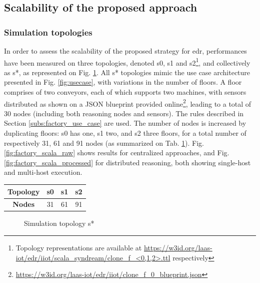 \documentclass{iosart2c}
\begin{document}
\subsection{Scalability of the proposed approach}
\label{subs:factory_scalability}
\subsubsection{Simulation topologies}

In order to assess the scalability of the proposed strategy for \gls{edr}, performances have been measured on three topologies, denoted s0, s1 and s2\footnote{Topology representations are available at \url{https://w3id.org/laas-iot/edr/iiot/scala_syndream/clone_f_<0,1,2>.ttl} respectively}, and collectively as s*, as represented on Fig. \ref{fig:factory_scala_topologies}. 
All s* topologies mimic the use case architecture presented in Fig. \ref{fig:usecase}, with variations in the number of floors.
A floor comprises of two conveyors, each of which supports two machines, with sensors distributed as shown on a JSON blueprint provided online\footnote{\url{https://w3id.org/laas-iot/edr/iiot/clone_f_0_blueprint.json}}, leading to a total of 30 nodes (including both reasoning nodes and sensors).
The rules described in Section \textsection \ref{subs:factory_use_case} are used.
The number of nodes is increased by duplicating floors: s0 has one, s1 two, and s2 three floors, for a total number of respectively 31, 61 and 91 nodes (as summarized on Tab. \ref{tab:scalability_factory_size}).
Fig. \ref{fig:factory_scala_raw} shows results for centralized approaches, and Fig. \ref{fig:factory_scala_processed} for distributed reasoning, both showing single-host and multi-host execution.

\begin{table}
	\centering
	\label{tab:scalability_factory_size}
	\begin{tabular}{|c|c|c|c|}
		\hline 
		\textbf{Topology} 	& s0 & s1 & s2 \\ \hline
		\textbf{Nodes} 		& 31 & 61 & 91 \\ \hline
	\end{tabular}
\end{table}

\begin{figure}
	\centering
	\caption{Simulation topology s*}
	\label{fig:factory_scala_topologies}
	\scalebox{0.75}{
		
	}
\end{figure}
\end{document}
